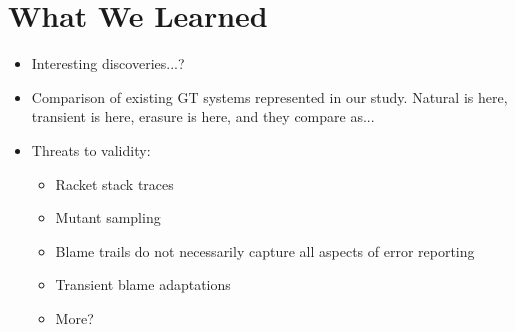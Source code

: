 \section{What We Learned}

\begin{itemize}
  \item Interesting discoveries...?

  \item Comparison of existing GT systems represented in our study.  
    Natural is here, transient is here, erasure is here, and they
        compare as...

      \item Threats to validity:
        \begin{itemize}
          \item Racket stack traces
          \item Mutant sampling
          \item Blame trails do not necessarily capture all aspects of error reporting
          \item Transient blame adaptations
          \item More?
        \end{itemize}
\end{itemize}        



